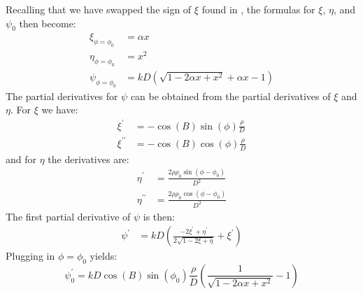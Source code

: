 \documentclass{article}
\theoremstyle{plain}
\begin{document}
        Recalling that we have swapped the sign of $\xi$ found in
        \cite[Eqn.~4]{MTR86}, the formulas for $\xi$, $\eta$, and $\psi_{0}$
        then become:
        \begin{subequations}
            \begin{align}
                \xi_{\phi=\phi_{0}}
                &=\alpha{x}\\
                \eta_{\phi=\phi_{0}}
                &=x^{2}\\
                \psi_{\phi=\phi_{0}}
                &=kD\left(
                    \sqrt{1-2\alpha{x}+x^{2}}
                    +\alpha{x}-1
                \right)
            \end{align}
        \end{subequations}
        The partial derivatives for $\psi$ can be obtained from the partial
        derivatives of $\xi$ and $\eta$. For $\xi$ we have:
        \begin{subequations}
            \begin{align}
                \xi^{\prime}
                &=-\cos(B)\sin(\phi)\frac{\rho}{D}\\
                \xi^{\prime\prime}
                &=-\cos(B)\cos(\phi)\frac{\rho}{D}
            \end{align}
        \end{subequations}
        and for $\eta$ the derivatives are:
        \begin{subequations}
            \begin{align}
                \eta^{\prime}
                &=\frac{2\rho\rho_{0}\sin(\phi-\phi_{0})}{D^{2}}\\
                \eta^{\prime\prime}
                &=\frac{2\rho\rho_{0}\cos(\phi-\phi_{0})}{D^{2}}
            \end{align}
        \end{subequations}
        The first partial derivative of $\psi$ is then:
        \begin{align}
            \psi^{\prime}
            &=kD\left(
                \frac{-2\xi^{\prime}+\eta^{\prime}}{2\sqrt{1-2\xi+\eta}}
                +\xi^{\prime}
            \right)
        \end{align}
        Plugging in $\phi=\phi_{0}$ yields:
        \begin{equation}
            \psi^{\prime}_{0}
            =kD\cos(B)\sin(\phi_{0})\frac{\rho}{D}\left(
                \frac{1}{\sqrt{1-2\alpha{x}+x^{2}}}-1
            \right)
        \end{equation}
\end{document}
